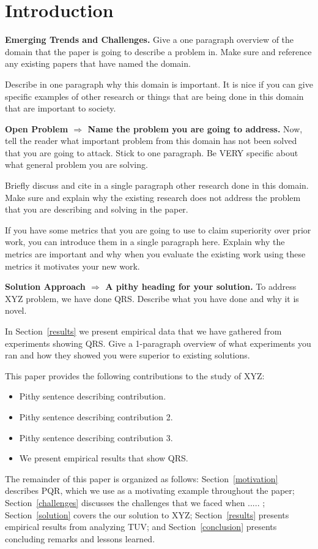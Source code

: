 \section{Introduction}

\textbf{Emerging Trends and Challenges.} 
Give a one paragraph overview of the domain that
the paper is going to describe a problem in. Make
sure and reference any existing papers that have
named the domain. 

Describe in one paragraph why this domain is important.
It is nice if you can give specific examples of other
research or things that are being done in this domain
that are important to society.

\textbf{Open Problem $\Rightarrow$ Name the problem
you are going to address.} 
Now, tell the reader what important problem from
this domain has not been solved that you are going
to attack. Stick to one paragraph. Be VERY specific about what general
problem you are solving. 

Briefly discuss and cite in a single paragraph other
research done in this domain. Make sure and explain
why the existing research does not address the 
problem that you are describing and solving in the
paper. 

If you have some metrics that you are going
to use to claim superiority over prior work, you
can introduce them in a single paragraph here.
Explain why the metrics are important and why
when you evaluate the existing work using these
metrics it motivates your new work.

\textbf{Solution Approach $\Rightarrow$ A pithy
heading for your solution.} To address XYZ
problem, we have done QRS. Describe what you
have done and why it is novel.

In Section~\ref{results} we present empirical
data that we have gathered from experiments
showing QRS. Give a 1-paragraph overview of
what experiments you ran and how they showed
you were superior to existing solutions.

This paper provides the following contributions
to the study of XYZ:

\begin{itemize}

\item Pithy sentence describing contribution.

\item Pithy sentence describing contribution 2.

\item Pithy sentence describing contribution 3.

\item We present empirical results that show QRS.

\end{itemize}

%
The remainder of this paper is organized as follows:
Section~\ref{motivation} describes PQR, which we
use as a motivating example throughout the paper;
Section~\ref{challenges} discusses the challenges that
we faced when ..... ; Section~\ref{solution} covers the our solution to XYZ; Section~\ref{results} presents empirical
results from analyzing TUV; and Section~\ref{conclusion}
presents concluding remarks and lessons learned.